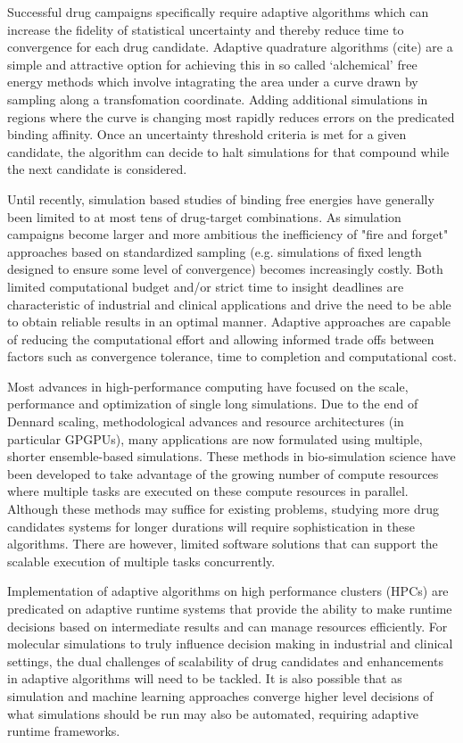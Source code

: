 Successful drug campaigns specifically require 
adaptive algorithms which can increase the fidelity of statistical uncertainty
and thereby reduce time to convergence for each drug candidate. 
Adaptive quadrature algorithms (cite) are a simple and attractive option for 
achieving this in so called `alchemical' free energy methods which involve intagrating 
the area under a curve drawn by sampling along a transfomation coordinate.
Adding additional simulations in regions where the curve is changing most rapidly
reduces errors on the predicated binding affinity. 
Once an uncertainty threshold criteria is met for a given candidate, the algorithm can 
decide to halt simulations for that compound while the next candidate is considered. 

Until recently, simulation based studies of binding free energies have generally 
been limited to at most tens of drug-target combinations. 
As simulation campaigns become larger and more ambitious the inefficiency of 
"fire and forget" approaches based on standardized sampling (e.g. simulations of 
fixed length designed to ensure some level of convergence) becomes increasingly 
costly.
Both limited computational budget and/or strict time to insight deadlines are 
characteristic of industrial and clinical applications and drive the need to be 
able to obtain reliable results in an optimal manner.
Adaptive approaches are capable of reducing the computational effort and 
allowing informed trade offs between factors such as convergence tolerance, 
time to completion and computational cost.

Most advances in high-performance computing have focused on the scale,
performance and optimization of single long simulations. Due to the end of
Dennard scaling, methodological advances and resource architectures (in 
particular GPGPUs), many applications are now formulated using multiple, shorter 
ensemble-based simulations.  
These methods in bio-simulation science have been developed to take advantage of 
the growing number of compute resources where multiple tasks are executed on 
these compute resources in parallel. Although these methods may suffice for 
existing problems, studying more drug candidates systems for longer durations 
will require sophistication in these algorithms. 
There are however, limited software solutions that can support the 
scalable execution of multiple tasks concurrently.

Implementation of adaptive algorithms on high performance clusters (HPCs) are 
predicated on adaptive runtime systems that provide the ability to make runtime 
decisions based on intermediate results and can manage resources efficiently. 
For molecular simulations to truly influence decision making in industrial and 
clinical settings, the dual challenges of scalability of drug candidates and 
enhancements in adaptive algorithms will need to be tackled. 
It is also possible that as simulation and machine learning approaches converge 
higher level decisions of what simulations should be run may also be automated, 
requiring adaptive runtime frameworks.

